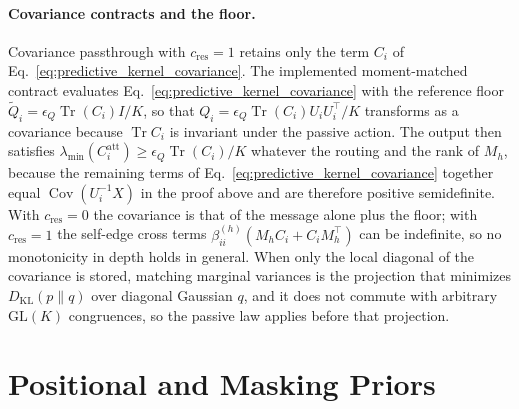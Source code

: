 \documentclass[twoside,11pt]{article}
\begin{document}
\paragraph{Covariance contracts and the floor.}
Covariance passthrough with $c_{\mathrm{res}}=1$ retains only the term $C_i$ of Eq.~\eqref{eq:predictive_kernel_covariance}. The implemented moment-matched contract evaluates Eq.~\eqref{eq:predictive_kernel_covariance} with the reference floor $\widetilde Q_i=\epsilon_Q\operatorname{Tr}(C_i)I/K$, so that $Q_i=\epsilon_Q\operatorname{Tr}(C_i)U_iU_i^\top/K$ transforms as a covariance because $\operatorname{Tr}C_i$ is invariant under the passive action. The output then satisfies $\lambda_{\min}(C_i^{\mathrm{att}})\ge\epsilon_Q\operatorname{Tr}(C_i)/K$ whatever the routing and the rank of $M_h$, because the remaining terms of Eq.~\eqref{eq:predictive_kernel_covariance} together equal $\operatorname{Cov}(U_i^{-1}X)$ in the proof above and are therefore positive semidefinite. With $c_{\mathrm{res}}=0$ the covariance is that of the message alone plus the floor; with $c_{\mathrm{res}}=1$ the self-edge cross terms $\beta_{ii}^{(h)}(M_hC_i+C_iM_h^\top)$ can be indefinite, so no monotonicity in depth holds in general. When only the local diagonal of the covariance is stored, matching marginal variances is the projection that minimizes $D_{\mathrm{KL}}(p\|q)$ over diagonal Gaussian $q$, and it does not commute with arbitrary $\mathrm{GL}(K)$ congruences, so the passive law applies before that projection.


\section{Positional and Masking Priors}
\label{sec:nonuniform_priors}
\end{document}
